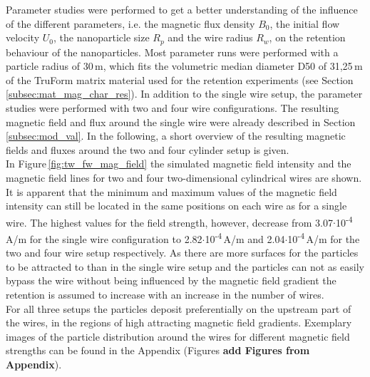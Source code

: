 Parameter studies were performed to get a better understanding of the influence of the different parameters, i.e. the magnetic flux density $B_{0}$, the initial flow velocity $U_{0}$, the nanoparticle size $R_{p}$ and the wire radius $R_{w}$, on the retention behaviour of the nanoparticles.
Most parameter runs were performed with a particle radius of 30\,\textmu m, which fits the volumetric median diameter D50 of 31,25\,\textmu m of the TruForm matrix material used for the retention experiments (see Section\,\ref{subsec:mat_mag_char_res}). In addition to the single wire setup, the parameter studies were performed with two and four wire configurations. The resulting magnetic field and flux around the single wire were already described in Section\,\ref{subsec:mod_val}. In the following, a short overview of the resulting  magnetic fields and fluxes around the two and four cylinder setup is given.\\
In Figure\,\ref{fig:tw_fw_mag_field} the simulated magnetic field intensity and the magnetic field lines for two and four two-dimensional cylindrical wires are shown. It is apparent that the minimum and maximum values of the magnetic field intensity can still be located in the same positions on each wire as for a single wire. The highest values for the field strength, however, decrease from 3.07$\cdotp$10\textsuperscript{-4}\,A/m for the single wire configuration to 2.82$\cdotp$10\textsuperscript{-4}\,A/m and 2.04$\cdotp$10\textsuperscript{-4}\,A/m for the two and four wire setup respectively. As there are more surfaces for the particles to be attracted to than in the single wire setup and the particles can not as easily bypass the wire without being influenced by the magnetic field gradient the retention is assumed to increase with an increase in the number of wires.\\
For all three setups the particles deposit preferentially on the upstream part of the wires, in the regions of high attracting magnetic field gradients. Exemplary images of the particle distribution around the wires for different magnetic field strengths can be found in the Appendix (Figures \textbf{add Figures from Appendix}). 

